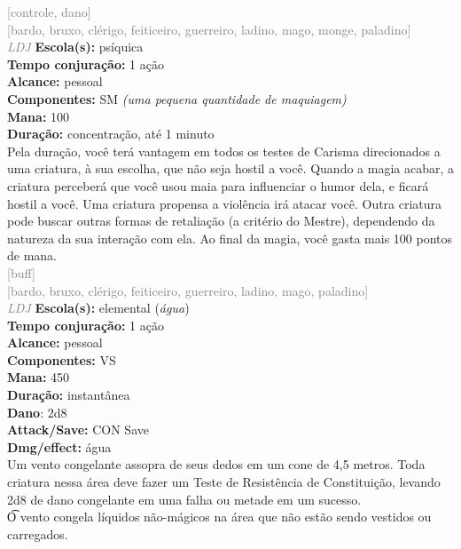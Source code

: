 \documentclass{RPG_Adventure}[2021/10/20]
\begin{document}
{\scriptsize \textcolor{gray}{[controle, dano]\\}}
{\scriptsize \textcolor{gray}{[bardo, bruxo, clérigo, feiticeiro, guerreiro, ladino, mago, monge, paladino]\\}}
{\tiny \textcolor{gray}{\textit{LDJ}}}
{\small \t \textbf{Escola(s):} psíquica\\\t \textbf{Tempo conjuração:} 1 ação\\\t \textbf{Alcance:} pessoal\\\t \textbf{Componentes:} SM \textit{(uma pequena quantidade de maquiagem)}\\\t \textbf{Mana:} 100\\\t \textbf{Duração:} concentração, até 1 minuto\\}
{\normalsize Pela duração, você terá vantagem em todos os testes de Carisma direcionados a uma criatura, à sua escolha, que não seja hostil a você. Quando a magia acabar, a criatura perceberá que você usou maia para influenciar o humor dela, e ficará hostil a você. Uma criatura propensa a violência irá atacar você. Outra criatura pode buscar outras formas de retaliação (a critério do Mestre), dependendo da natureza da sua interação com ela. Ao final da magia, você gasta mais 100 pontos de mana.\\}
{\scriptsize \textcolor{gray}{[buff]\\}}
{\scriptsize \textcolor{gray}{[bardo, bruxo, clérigo, feiticeiro, guerreiro, ladino, mago, paladino]\\}}
{\tiny \textcolor{gray}{\textit{LDJ}}}
{\small \t \textbf{Escola(s):} elemental (\textit{água})\\\t \textbf{Tempo conjuração:} 1 ação\\\t \textbf{Alcance:} pessoal\\\t \textbf{Componentes:} VS\\\t \textbf{Mana:} 450\\\t \textbf{Duração:} instantânea\\\t \textbf{Dano}: 2d8\\\t \textbf{Attack/Save:} CON Save\\\t \textbf{Dmg/effect:} água\\}
{\normalsize Um vento congelante assopra de seus dedos em um cone de 4,5 metros. Toda criatura nessa área deve fazer um Teste de Resistência de Constituição, levando 2d8 de dano congelante em uma falha ou metade em um sucesso.\\\t O vento congela líquidos não-mágicos na área que não estão sendo vestidos ou carregados.\\}
\end{document}
